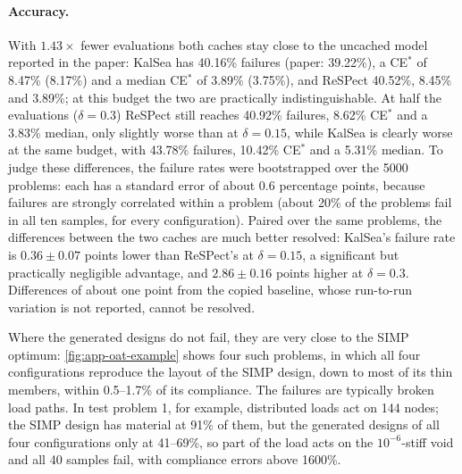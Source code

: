 \paragraph{Accuracy.} With $1.43\times$ fewer evaluations both caches stay close to the uncached model reported in the paper: KalSea has 40.16\% failures (paper: 39.22\%), a CE$^*$ of 8.47\% (8.17\%) and a median CE$^*$ of 3.89\% (3.75\%), and ReSPect 40.52\%, 8.45\% and 3.89\%; at this budget the two are practically indistinguishable. At half the evaluations ($\delta=0.3$) ReSPect still reaches 40.92\% failures, 8.62\% CE$^*$ and a 3.83\% median, only slightly worse than at $\delta=0.15$, while KalSea is clearly worse at the same budget, with 43.78\% failures, 10.42\% CE$^*$ and a 5.31\% median. To judge these differences, the failure rates were bootstrapped over the 5000 problems: each has a standard error of about 0.6 percentage points, because failures are strongly correlated within a problem (about 20\% of the problems fail in all ten samples, for every configuration). Paired over the same problems, the differences between the two caches are much better resolved: KalSea's failure rate is $0.36\pm0.07$ points lower than ReSPect's at $\delta=0.15$, a significant but practically negligible advantage, and $2.86\pm0.16$ points higher at $\delta=0.3$. Differences of about one point from the copied baseline, whose run-to-run variation is not reported, cannot be resolved.

Where the generated designs do not fail, they are very close to the SIMP optimum: \cref{fig:app-oat-example} shows four such problems, in which all four configurations reproduce the layout of the SIMP design, down to most of its thin members, within 0.5--1.7\% of its compliance. The failures are typically broken load paths. In test problem 1, for example, distributed loads act on 144 nodes; the SIMP design has material at 91\% of them, but the generated designs of all four configurations only at 41--69\%, so part of the load acts on the $10^{-6}$-stiff void and all 40 samples fail, with compliance errors above 1600\%.

